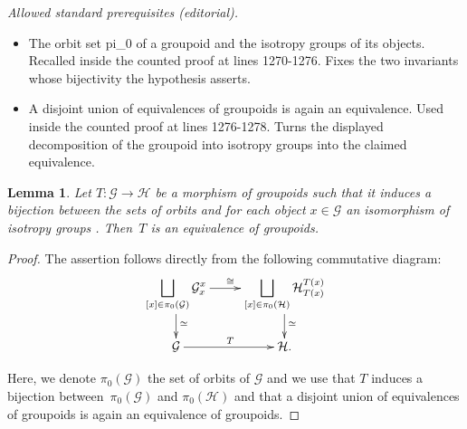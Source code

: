 \documentclass[10pt,a4paper]{amsart}
\newtheorem{Lemma}[Theorem]{Lemma}
\begin{document}
\noindent\textit{Allowed standard prerequisites (editorial).}\begin{itemize}
\item The orbit set pi\_0 of a groupoid and the isotropy groups of its objects. Recalled inside the counted proof at lines 1270-1276. Fixes the two invariants whose bijectivity the hypothesis asserts.
\item A disjoint union of equivalences of groupoids is again an equivalence. Used inside the counted proof at lines 1276-1278. Turns the displayed decomposition of the groupoid into isotropy groups into the claimed equivalence.
\end{itemize}\medskip
	\begin{Lemma}\label{lem:groupoid_eq}
		Let $T\colon \mathcal{G}\to \mathcal{H}$ be a morphism of groupoids such that it induces a
		bijection between the sets of orbits and for each object $x\in \mathcal{G}$ an
		isomorphism of isotropy groups . Then~$T$
		is an equivalence of groupoids.
	\end{Lemma}

	\begin{proof}
		The assertion follows directly from the following commutative diagram:
		\begin{equation*}
			\xymatrix{\displaystyle\bigsqcup_{[x]\in\pi_0(\mathcal{G})}\mathcal{G}^x_x\ar[r]^{\cong}\ar[d]^(.6){\simeq} &
				\displaystyle\bigsqcup_{[x]\in\pi_0(\mathcal{H})}\mathcal{H}^{T(x)}_{T(x)}\ar[d]^(.6){\simeq}\\
				\mathcal{G}\ar[r]^T&\mathcal{H}.}
		\end{equation*}
		
		Here, we denote $\pi_0(\mathcal{G})$ the set of orbits of $\mathcal{G}$ and we use that $T$
		induces a bijection between~$\pi_0(\mathcal{G})$ and $\pi_0(\mathcal{H})$
		and that a disjoint union of equivalences of groupoids is again an equivalence
		of groupoids.
	\end{proof}
\end{document}
